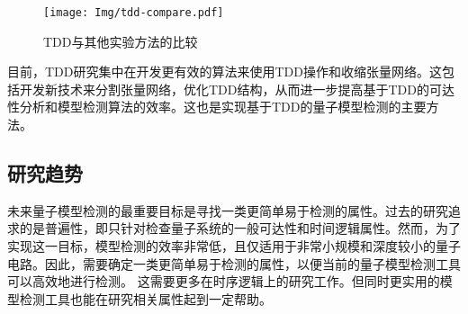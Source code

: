 \begin{figure}[!htbp]
    \centering
    \texttt{[image: Img/tdd-compare.pdf]}
    \caption{TDD与其他实验方法的比较\citep{Hong_2022}}
    \label{fig:tdd-compare}
\end{figure}

目前，TDD研究集中在开发更有效的算法来使用TDD操作和收缩张量网络。这包括开发新技术来分割张量网络，优化TDD结构，从而进一步提高基于TDD的可达性分析和模型检测算法的效率。这也是实现基于TDD的量子模型检测的主要方法。
\subsection{研究趋势}
未来量子模型检测的最重要目标是寻找一类更简单易于检测的属性。过去的研究追求的是普遍性，即只针对检查量子系统的一般可达性和时间逻辑属性。然而，为了实现这一目标，模型检测的效率非常低，且仅适用于非常小规模和深度较小的量子电路。因此，需要确定一类更简单易于检测的属性，以便当前的量子模型检测工具可以高效地进行检测\citep{ying2021model}。
这需要更多在时序逻辑上的研究工作。但同时更实用的模型检测工具也能在研究相关属性起到一定帮助。
